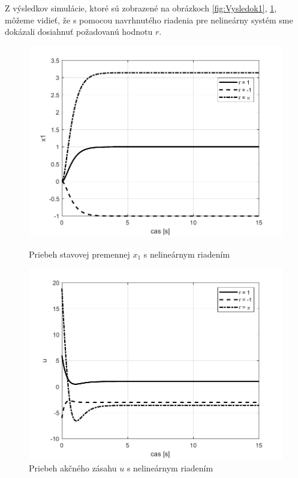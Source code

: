 \documentclass[../main.tex]{subfiles}
\begin{document}
Z výsledkov simulácie, ktoré sú zobrazené na obrázkoch \ref{fig:Vysledok1}, \ref{fig:Vysledok2}, môžeme vidieť, že s pomocou navrhnutého riadenia pre nelineárny systém sme dokázali dosiahnuť požadovanú hodnotu $r$.
\begin{figure}[!htb]
   \begin{minipage}{0.46\textwidth}
     \centering
     \includegraphics[width=1\linewidth]{x.pdf}
     \caption{Priebeh stavovej premennej $x_1$ s nelineárnym riadením}
	\label{fig:Vysledok1}
   \end{minipage}\hfill
   \begin{minipage}{0.46\textwidth}
     \centering
     \includegraphics[width=1\linewidth]{u.pdf}
     \caption{Priebeh akčného zásahu $u$ s nelineárnym riadením}
	\label{fig:Vysledok2}
   \end{minipage}
\end{figure}
\end{document}

